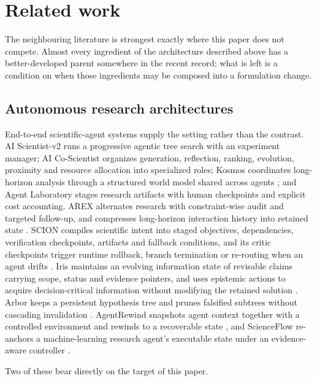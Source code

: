 \section{Related work}
\label{sec:relatedwork}

The neighbouring literature is strongest exactly where this paper does not
compete. Almost every ingredient of the architecture described above has a
better-developed parent somewhere in the recent record; what is left is a
condition on when those ingredients may be composed into a formulation change.

\subsection{Autonomous research architectures}

End-to-end scientific-agent systems supply the setting rather than the contrast.
AI Scientist-v2 runs a progressive agentic tree search with an experiment
manager; AI Co-Scientist organizes generation, reflection, ranking, evolution,
proximity and resource allocation into specialized roles; Kosmos coordinates
long-horizon analysis through a structured world model shared across agents
\cite{kosmos2025}; and Agent Laboratory stages research artifacts with human
checkpoints and explicit cost accounting. AREX alternates research with
constraint-wise audit and targeted follow-up, and compresses long-horizon
interaction history into retained state \cite{arex2026}. SCION compiles
scientific intent into staged objectives, dependencies, verification checkpoints,
artifacts and fallback conditions, and its critic checkpoints trigger runtime
rollback, branch termination or re-routing when an agent drifts
\cite{scion2026}. Iris maintains an evolving information state of revisable
claims carrying scope, status and evidence pointers, and uses epistemic actions
to acquire decision-critical information without modifying the retained solution
\cite{iris2026}. Arbor keeps a persistent hypothesis tree and prunes falsified
subtrees without cascading invalidation \cite{arbor2026}. AgentRewind snapshots
agent context together with a controlled environment and rewinds to a
recoverable state \cite{agentrewind2026}, and ScienceFlow re-anchors a
machine-learning research agent's executable state under an evidence-aware
controller \cite{scienceflow2026}.

Two of these bear directly on the target of this paper.

